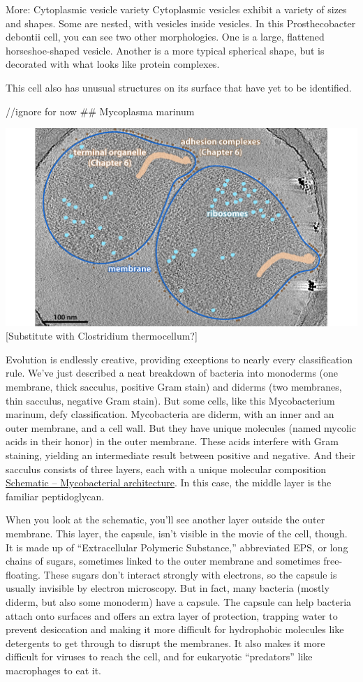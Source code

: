 \documentclass[]{tufte-book}
\begin{document}
More: Cytoplasmic vesicle variety Cytoplasmic vesicles exhibit a variety
of sizes and shapes. Some are nested, with vesicles inside vesicles. In
this Prosthecobacter debontii cell, you can see two other morphologies.
One is a large, flattened horseshoe-shaped vesicle. Another is a more
typical spherical shape, but is decorated with what looks like protein
complexes.

This cell also has unusual structures on its surface that have yet to be
identified.

//ignore for now \#\# Mycoplasma marinum

\includegraphics{img/02_static/2_1_Mgenitalium} {[}Substitute with
Clostridium thermocellum?{]}

Evolution is endlessly creative, providing exceptions to nearly every
classification rule. We've just described a neat breakdown of bacteria
into monoderms (one membrane, thick sacculus, positive Gram stain) and
diderms (two membranes, thin sacculus, negative Gram stain). But some
cells, like this Mycobacterium marinum, defy classification.
Mycobacteria are diderm, with an inner and an outer membrane, and a cell
wall. But they have unique molecules (named mycolic acids in their
honor) in the outer membrane. These acids interfere with Gram staining,
yielding an intermediate result between positive and negative. And their
sacculus consists of three layers, each with a unique molecular
composition \protect\hyperlink{fig:2-5-1}{Schematic -- Mycobacterial
architecture}. In this case, the middle layer is the familiar
peptidoglycan.

When you look at the schematic, you'll see another layer outside the
outer membrane. This layer, the capsule, isn't visible in the movie of
the cell, though. It is made up of ``Extracellular Polymeric
Substance,'' abbreviated EPS, or long chains of sugars, sometimes linked
to the outer membrane and sometimes free-floating. These sugars don't
interact strongly with electrons, so the capsule is usually invisible by
electron microscopy. But in fact, many bacteria (mostly diderm, but also
some monoderm) have a capsule. The capsule can help bacteria attach onto
surfaces and offers an extra layer of protection, trapping water to
prevent desiccation and making it more difficult for hydrophobic
molecules like detergents to get through to disrupt the membranes. It
also makes it more difficult for viruses to reach the cell, and for
eukaryotic ``predators'' like macrophages to eat it.
\end{document}
